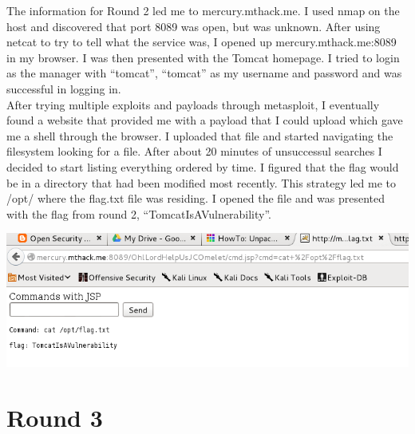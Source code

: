 \documentclass[12pt]{report}
\newcommand{\mychapter}[2]{
    \setcounter{chapter}{#1}
    \setcounter{section}{0}
    \chapter*{#2}
    \addcontentsline{toc}{chapter}{#2}
}
\begin{document}
The information for Round 2 led me to mercury.mthack.me. I used nmap on the host and discovered that port 8089 was open, but was unknown. After using netcat to try to tell what the service was, I opened up mercury.mthack.me:8089 in my browser. I was then presented with the Tomcat homepage. I tried to login as the manager with ``tomcat'', ``tomcat'' as my username and password and was successful in logging in.\\
\newline
After trying multiple exploits and payloads through metasploit, I eventually found a website that provided me with a payload that I could upload which gave me a shell through the browser. I uploaded that file and started navigating the filesystem looking for a file. After about 20 minutes of unsuccessul searches I decided to start listing everything ordered by time. I figured that the flag would be in a directory that had been modified most recently. This strategy led me to /opt/ where the flag.txt file was residing. I opened the file and was presented with the flag from round 2, ``TomcatIsAVulnerability''.\\
\newline
\begin{center}
\includegraphics[scale=0.33]{TomcatIsAVulnerability.png}
\end{center}


\mychapter{3}{Round 3}
\end{document}
